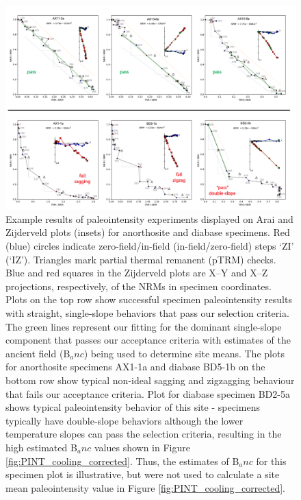 \documentclass[draft]{agujournal2019}
\begin{document}
\begin{figure}[h!]
\noindent\includegraphics[width=\textwidth]{IZZI_examples.pdf}
\centering
\caption{\footnotesize{Example results of paleointensity experiments displayed on Arai and Zijderveld plots (insets) for anorthosite and diabase specimens. Red (blue) circles indicate zero-field/in-field (in-field/zero-field) steps `ZI’ (`IZ’). Triangles mark partial thermal remanent (pTRM) checks. Blue and red squares in the Zijderveld plots are X–Y and X–Z projections, respectively, of the NRMs in specimen coordinates. Plots on the top row show successful specimen paleointensity results with straight, single-slope behaviors that pass our selection criteria. The green lines represent our fitting for the dominant single-slope component that passes our acceptance criteria with estimates of the ancient field (B$_anc$) being used to determine site means. The plots for anorthosite specimens AX1-1a and diabase BD5-1b on the bottom row show typical non-ideal sagging and zigzagging behaviour that fails our acceptance criteria. Plot for diabase specimen BD2-5a shows typical paleointensity behavior of this site - specimens typically have double-slope behaviors although the lower temperature slopes can pass the selection criteria, resulting in the high estimated B$_anc$ values shown in Figure \ref{fig:PINT_cooling_corrected}. Thus, the estimates of B$_anc$ for this specimen plot is illustrative, but were not used to calculate a site mean paleointensity value in Figure \ref{fig:PINT_cooling_corrected}.}}
\label{fig:IZZI_examples}
\end{figure}
\end{document}
